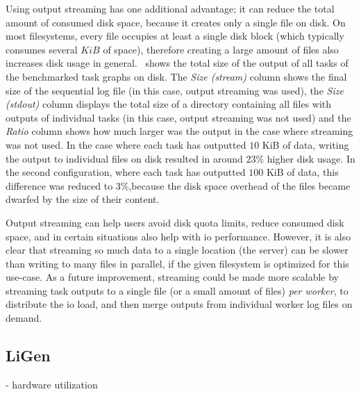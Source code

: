 Using output streaming has one additional advantage; it can reduce the total amount of consumed
disk space, because it creates only a single file on disk. On most filesystems, every file occupies
at least a single disk block (which typically consumes several $KiB$ of space),
therefore creating a large amount of files also increases disk usage in
general.~ shows the total size of the output of all tasks of the benchmarked
task graphs on disk. The \emph{Size (stream)} column shows the final size of the sequential log
file (in this case, output streaming was used), the \emph{Size (stdout)} column displays the
total size of a directory containing all files with outputs of individual tasks (in this case,
output streaming was not used) and the \emph{Ratio} column shows how much larger was the
output in the case where streaming was not used. In the case where each task has outputted
$10$ KiB of data, writing the output to individual files on disk resulted in
around $23\%$ higher disk usage. In the second configuration, where each task has
outputted $100$ KiB of data, this difference was reduced to
$3\%$,because the disk space overhead of the files became dwarfed by the size of
their content.

Output streaming can help users avoid disk quota limits, reduce consumed disk space, and in certain
situations also help with \gls{io} performance. However, it is also clear that
streaming so much data to a single location (the server) can be slower than writing to many files
in parallel, if the given filesystem is optimized for this use-case. As a future improvement,
streaming could be made more scalable by streaming task outputs to a single file (or a small amount
of files) \emph{per worker}, to distribute the \gls{io} load, and then merge
outputs from individual worker log files on demand.


\subsection{LiGen}
\label{sec:hq-exp-ligen}
- hardware utilization

